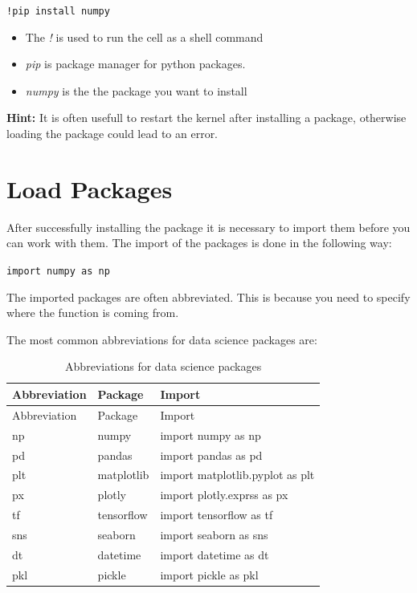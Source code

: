 \documentclass[
  letterpaper,
  DIV=11,
  numbers=noendperiod]{scrreprt}
\begin{document}
\texttt{!pip\ install\ numpy}

\begin{itemize}
\item
  The \emph{!} is used to run the cell as a shell command
\item
  \emph{pip} is package manager for python packages.
\item
  \emph{numpy} is the the package you want to install
\end{itemize}

\textbf{Hint:} It is often usefull to restart the kernel after
installing a package, otherwise loading the package could lead to an
error.

\section{Load Packages}\label{load-packages}

After successfully installing the package it is necessary to import them
before you can work with them. The import of the packages is done in the
following way:

\texttt{import\ numpy\ as\ np}

The imported packages are often abbreviated. This is because you need to
specify where the function is coming from.

The most common abbreviations for data science packages are:

\begin{longtable}[]{@{}lll@{}}
\caption{Abbreviations for data science packages}\tabularnewline
\toprule\noalign{}
Abbreviation & Package & Import \\
\midrule\noalign{}
\endfirsthead
\toprule\noalign{}
Abbreviation & Package & Import \\
\midrule\noalign{}
\endhead
\bottomrule\noalign{}
\endlastfoot
np & numpy & import numpy as np \\
pd & pandas & import pandas as pd \\
plt & matplotlib & import matplotlib.pyplot as plt \\
px & plotly & import plotly.exprss as px \\
tf & tensorflow & import tensorflow as tf \\
sns & seaborn & import seaborn as sns \\
dt & datetime & import datetime as dt \\
pkl & pickle & import pickle as pkl \\
\end{longtable}
\end{document}
